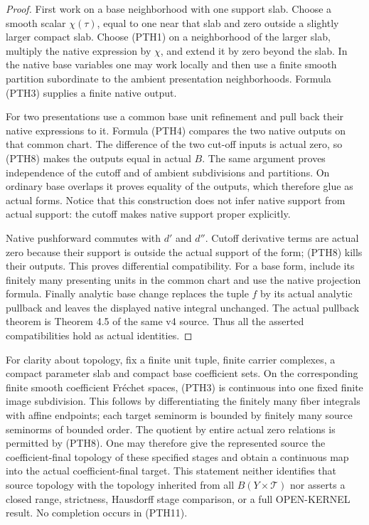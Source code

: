 \begin{proof}
First work on a base neighborhood with one support slab.  Choose
a smooth scalar $\chi(\tau)$, equal to one near that slab and
zero outside a slightly larger compact slab.  Choose (PTH1) on
a neighborhood of the larger slab, multiply the native expression
by $\chi$, and extend it by zero beyond the slab.  In the native
base variables one may work locally and then use a finite smooth
partition subordinate to the ambient presentation neighborhoods.
Formula (PTH3) supplies a finite native output.

For two presentations use a common base unit refinement and
pull back their native expressions to it.  Formula (PTH4) compares
the two native outputs on that common chart.  The difference of
the two cut-off inputs is actual zero, so (PTH8) makes the
outputs equal in actual $B$.  The same argument proves
independence of the cutoff and of ambient subdivisions and
partitions.  On ordinary base overlaps it proves equality of
the outputs, which therefore glue as actual forms.  Notice that
this construction does not infer native support from actual
support: the cutoff makes native support proper explicitly.

Native pushforward commutes with $d'$ and $d''$.  Cutoff derivative
terms are actual zero because their support is outside the
actual support of the form; (PTH8) kills their outputs.  This
proves differential compatibility.  For a base form, include
its finitely many presenting units in the common chart and
use the native projection formula.  Finally analytic base
change replaces the tuple $f$ by its actual analytic pullback
and leaves the displayed native integral unchanged.  The actual
pullback theorem is Theorem 4.5 of the same v4 source.  Thus
all the asserted compatibilities hold as actual identities.
\end{proof}

For clarity about topology, fix a finite unit tuple, finite
carrier complexes, a compact parameter slab and compact base
coefficient sets.  On the corresponding finite smooth coefficient
Fr\'echet spaces, (PTH3) is continuous into one fixed finite
image subdivision.  This follows by differentiating the finitely
many fiber integrals with affine endpoints; each target seminorm
is bounded by finitely many source seminorms of bounded order.
The quotient by entire actual zero relations is permitted by
(PTH8).  One may therefore give the represented source the
coefficient-final topology of these specified stages and obtain
a continuous map into the actual coefficient-final target.
This statement neither identifies that source topology with
the topology inherited from all $B(Y\times\mathcal T)$ nor
asserts a closed range, strictness, Hausdorff stage comparison,
or a full OPEN-KERNEL result.  No completion occurs in (PTH11).

